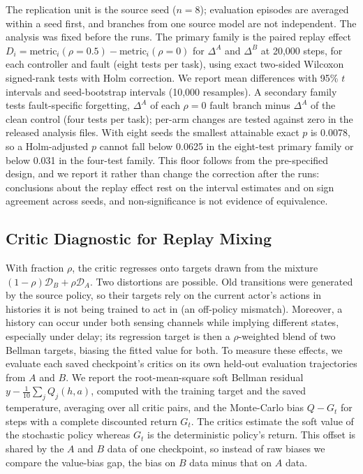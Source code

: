 \documentclass[runningheads]{llncs}
\begin{document}
The replication unit is the source seed ($n=8$); evaluation episodes are averaged within a seed first, and branches from one source model are not independent. The analysis was fixed before the runs. The primary family is the paired replay effect $D_i=\text{metric}_i(\rho{=}0.5)-\text{metric}_i(\rho{=}0)$ for $\Delta^A$ and $\Delta^B$ at 20,000 steps, for each controller and fault (eight tests per task), using exact two-sided Wilcoxon signed-rank tests with Holm correction. We report mean differences with 95\% $t$ intervals and seed-bootstrap intervals (10,000 resamples). A secondary family tests fault-specific forgetting, $\Delta^A$ of each $\rho=0$ fault branch minus $\Delta^A$ of the clean control (four tests per task); per-arm changes are tested against zero in the released analysis files. With eight seeds the smallest attainable exact $p$ is 0.0078, so a Holm-adjusted $p$ cannot fall below 0.0625 in the eight-test primary family or below 0.031 in the four-test family. This floor follows from the pre-specified design, and we report it rather than change the correction after the runs: conclusions about the replay effect rest on the interval estimates and on sign agreement across seeds, and non-significance is not evidence of equivalence.

\subsection{Critic Diagnostic for Replay Mixing}\label{sec:critic}
With fraction $\rho$, the critic regresses onto targets drawn from the mixture $(1-\rho)\mathcal{D}_B+\rho\mathcal{D}_A$. Two distortions are possible. Old transitions were generated by the source policy, so their targets rely on the current actor's actions in histories it is not being trained to act in (an off-policy mismatch). Moreover, a history can occur under both sensing channels while implying different states, especially under delay; its regression target is then a $\rho$-weighted blend of two Bellman targets, biasing the fitted value for both. To measure these effects, we evaluate each saved checkpoint's critics on its own held-out evaluation trajectories from $A$ and $B$. We report the root-mean-square soft Bellman residual $y-\frac{1}{10}\sum_j Q_j(h,a)$, computed with the training target and the saved temperature, averaging over all critic pairs, and the Monte-Carlo bias $Q-G_t$ for steps with a complete discounted return $G_t$. The critics estimate the soft value of the stochastic policy whereas $G_t$ is the deterministic policy's return. This offset is shared by the $A$ and $B$ data of one checkpoint, so instead of raw biases we compare the value-bias gap, the bias on $B$ data minus that on $A$ data.
\end{document}

